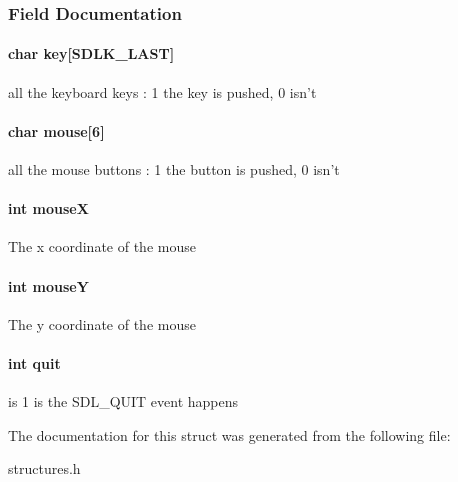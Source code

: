 \subsubsection{Field Documentation}
\hypertarget{struct_input_afc4eabd057bd0061b56de4005f5ecbb8}{
\paragraph[{key}]{\setlength{\rightskip}{0pt plus 5cm}char key\mbox{[}S\-D\-L\-K\-\_\-\-L\-A\-S\-T\mbox{]}}}\label{struct_input_afc4eabd057bd0061b56de4005f5ecbb8}
all the keyboard keys \-: 1 the key is pushed, 0 isn't \hypertarget{struct_input_abdf8b0b51bc72dab0a8b2c2b550620d9}{
\paragraph[{mouse}]{\setlength{\rightskip}{0pt plus 5cm}char mouse\mbox{[}6\mbox{]}}}\label{struct_input_abdf8b0b51bc72dab0a8b2c2b550620d9}
all the mouse buttons \-: 1 the button is pushed, 0 isn't \hypertarget{struct_input_a85ea1b63086b31a15d3ed2579c5715a6}{
\paragraph[{mouse\-X}]{\setlength{\rightskip}{0pt plus 5cm}int mouse\-X}}\label{struct_input_a85ea1b63086b31a15d3ed2579c5715a6}
The x coordinate of the mouse \hypertarget{struct_input_a3637abebcaa9d04aa18b1610d0921e16}{
\paragraph[{mouse\-Y}]{\setlength{\rightskip}{0pt plus 5cm}int mouse\-Y}}\label{struct_input_a3637abebcaa9d04aa18b1610d0921e16}
The y coordinate of the mouse \hypertarget{struct_input_a2896431d6a80cd39b3d24b40237612ee}{
\paragraph[{quit}]{\setlength{\rightskip}{0pt plus 5cm}int quit}}\label{struct_input_a2896431d6a80cd39b3d24b40237612ee}
is 1 is the S\-D\-L\-\_\-\-Q\-U\-I\-T event happens 

The documentation for this struct was generated from the following file\-:\begin{DoxyCompactItemize}
\item 
structures.\-h\end{DoxyCompactItemize}
